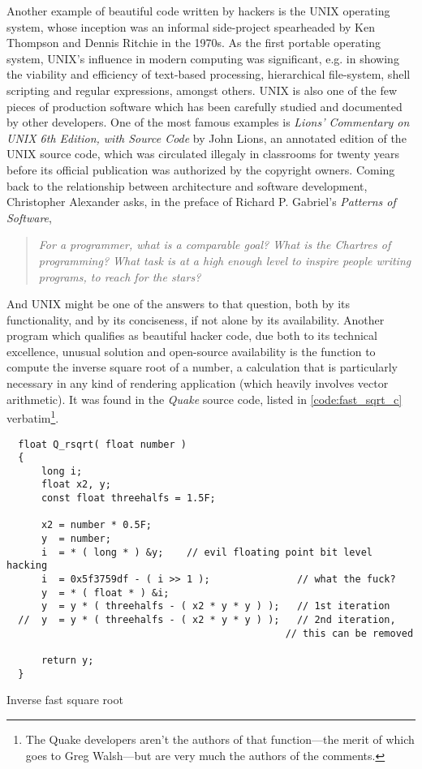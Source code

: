 Another example of beautiful code written by hackers is the UNIX operating system, whose inception was an informal side-project spearheaded by Ken Thompson and Dennis Ritchie in the 1970s. As the first portable operating system, UNIX's influence in modern computing was significant, e.g. in showing the viability and efficiency of text-based processing, hierarchical file-system, shell scripting and regular expressions, amongst others. UNIX is also one of the few pieces of production software which has been carefully studied and documented by other developers. One of the most famous examples is \emph{Lions' Commentary on UNIX 6th Edition, with Source Code} by John Lions, an annotated edition of the UNIX source code, which was circulated illegaly in classrooms for twenty years before its official publication was authorized by the copyright owners\cite{lions_lions_1996}. Coming back to the relationship between architecture and software development, Christopher Alexander asks, in the preface of Richard P. Gabriel's \textit{Patterns of Software}\cite{gabriel_patterns_1998},

\begin{quote}
  \textit{For a programmer, what is a comparable goal? What is the Chartres of programming? What task is at a high enough level to inspire people writing programs, to reach for the stars?}
\end{quote}

And UNIX might be one of the answers to that question, both by its functionality, and by its conciseness, if not alone by its availability. Another program which qualifies as beautiful hacker code, due both to its technical excellence, unusual solution and open-source availability is the function to compute the inverse square root of a number, a calculation that is particularly necessary in any kind of rendering application (which heavily involves vector arithmetic). It was found in the \emph{Quake} source code, listed in \ref{code:fast_sqrt_c} verbatim\footnote{The Quake developers aren't the authors of that function—the merit of which goes to Greg Walsh—but are very much the authors of the comments.}.

\pagebreak

\begin{listing}
  \begin{verbatim}
  float Q_rsqrt( float number )
  {
      long i;
      float x2, y;
      const float threehalfs = 1.5F;

      x2 = number * 0.5F;
      y  = number;
      i  = * ( long * ) &y;    // evil floating point bit level hacking
      i  = 0x5f3759df - ( i >> 1 );               // what the fuck? 
      y  = * ( float * ) &i;
      y  = y * ( threehalfs - ( x2 * y * y ) );   // 1st iteration
  //  y  = y * ( threehalfs - ( x2 * y * y ) );   // 2nd iteration,
                                                // this can be removed

      return y;
  }
\end{verbatim}
  \caption{Inverse fast square root}
  \label{code:fast_sqrt_c}
\end{listing}

